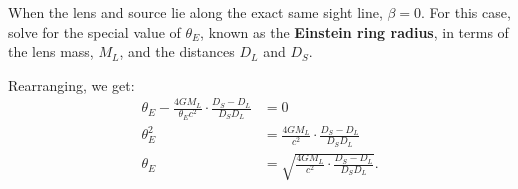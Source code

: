 \documentclass{../../templates/lkx_pset}
\begin{document}
\begin{problem}{4}
  When the lens and source lie along the exact same sight line, $\beta = 0$. For this case, solve for the special value of $\theta_E$, known as the \textbf{Einstein ring radius}, in terms of the lens mass, $M_L$, and the distances $D_L$ and $D_S$.
\end{problem}

\begin{solution}
  Rearranging, we get:
  \[
      \begin{aligned}
        \theta_E - \frac{4GM_L}{\theta_E c^2}\cdot \frac{D_S - D_L}{D_S D_L} 
        &= 0\\
        \theta^2_E &= \frac{4GM_L}{c^2}\cdot \frac{D_S - D_L}{D_S D_L}\\
        \theta_E &= \sqrt{\frac{4GM_L}{c^2}\cdot \frac{D_S - D_L}{D_S D_L}}.
      \end{aligned}
  \]
\end{solution}
\end{document}

